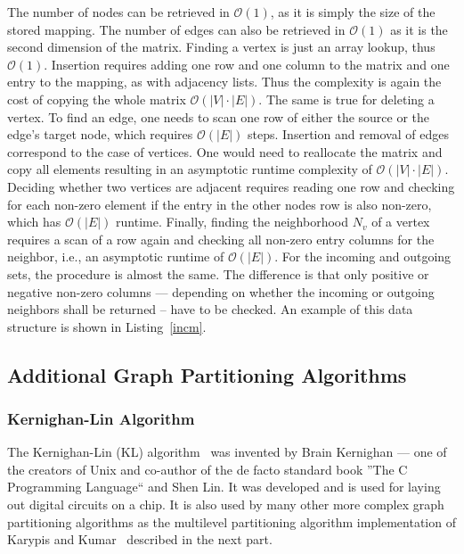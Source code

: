             The number of nodes can be retrieved in $\mathcal{O}(1)$, as it is simply the size of the stored mapping.
            The number of edges can also be retrieved in $\mathcal{O}(1)$ as it is the second dimension of the matrix.
            Finding a vertex is just an array lookup, thus $\mathcal{O}(1)$.
            Insertion requires adding one row and one column to the matrix and one entry to the mapping, as with adjacency lists. 
            Thus the complexity is again the cost of copying the whole matrix $\mathcal{O}(|V| \cdot |E|)$. 
            The same is true for deleting a vertex.         
            To find an edge, one needs to scan one row of either the source or the edge's target node, which requires $\mathcal{O}(|E|)$ steps.
            Insertion and removal of edges correspond to the case of vertices.
            One would need to reallocate the matrix and copy all elements resulting in an asymptotic runtime complexity of $\mathcal{O}(|V| \cdot |E|)$. 
            Deciding whether two vertices are adjacent requires reading one row and checking for each non-zero element if the entry in the other nodes row is also non-zero, which has $\mathcal{O}(|E|)$ runtime.        
            Finally, finding the neighborhood $N_v$ of a vertex requires a scan of a row again and checking all non-zero entry columns for the neighbor, i.e., an asymptotic runtime of $\mathcal{O}(|E|)$. 
            For the incoming and outgoing sets, the procedure is almost the same. 
            The difference is that only positive or negative non-zero columns --- depending on whether the incoming or outgoing neighbors shall be returned -- have to be checked.
            An example of this data structure is shown in Listing~\ref{incm}.
        

        
    \subsection{Additional Graph Partitioning Algorithms}
        \subsubsection*{Kernighan-Lin Algorithm}\label{kla}
            The Kernighan-Lin (KL) algorithm~\autocite{kl} was invented by Brain Kernighan --- one of the creators of Unix and co-author of the de facto standard book ''The C Programming Language`` and  Shen Lin.
            It was developed and is used for laying out digital circuits on a chip. 
            It is also used by many other more complex graph partitioning algorithms as the multilevel partitioning algorithm implementation of Karypis and Kumar~\autocite{karypis} described in the next part.
            

